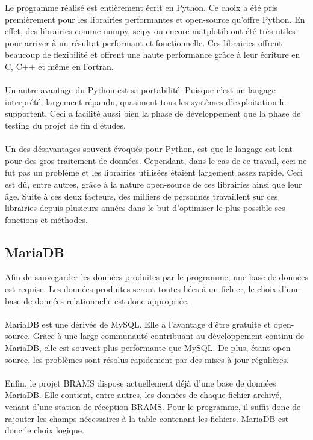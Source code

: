 \documentclass[11pt]{article}
\begin{document}
Le programme réalisé est entièrement écrit en Python.
Ce choix a été pris premièrement pour les librairies performantes et open-source qu'offre Python.
En effet, des librairies comme numpy, scipy ou encore matplotib ont été très utiles pour arriver à un résultat performant et fonctionnelle.
Ces librairies offrent beaucoup de flexibilité et offrent une haute performance grâce à leur écriture en C, C++ et même en Fortran.\\
\\
Un autre avantage du Python est sa portabilité.
Puisque c'est un langage interprété, largement répandu, quasiment tous les systèmes d'exploitation le supportent.
Ceci a facilité aussi bien la phase de développement que la phase de testing du projet de fin d'études.\\
\\
Un des désavantages souvent évoqués pour Python, est que le langage est lent pour des gros traitement de données.
Cependant, dans le cas de ce travail, ceci ne fut pas un problème et les librairies utilisées étaient largement assez rapide.
Ceci est dû, entre autres, grâce à la nature open-source de ces librairies ainsi que leur âge.
Suite à ces deux facteurs, des milliers de personnes travaillent sur ces librairies depuis plusieurs années dans le but d'optimiser le plus possible ses fonctions et méthodes.

\subsection{MariaDB}

Afin de sauvegarder les données produites par le programme, une base de données est requise.
Les données produites seront toutes liées à un fichier, le choix d'une base de données relationnelle est donc appropriée.\\
\\
MariaDB est une dérivée de MySQL.
Elle a l'avantage d'être gratuite et open-source.
Grâce à une large communauté contribuant au développement continu de MariaDB, elle est souvent plus performante que MySQL.
De plus, étant open-source, les problèmes sont résolus rapidement par des mises à jour régulières.\\
\\
Enfin, le projet BRAMS dispose actuellement déjà d'une base de données MariaDB.
Elle contient, entre autres, les données de chaque fichier archivé, venant d'une station de réception BRAMS.
Pour le programme, il suffit donc de rajouter les champs nécessaires à la table contenant les fichiers.
MariaDB est donc le choix logique.
\end{document}
